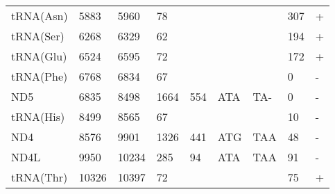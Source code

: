\documentclass[../DISSERTACAO_MAIN.tex]{subfiles}
\begin{document}
\begin{longtable}{llllllllllllllllllllll}
			tRNA(Asn)    & 5883           & \multicolumn{2}{l}{5960}  & \multicolumn{2}{l}{78}         & \multicolumn{3}{l}{}                          & \multicolumn{3}{l}{}              & \multicolumn{3}{l}{}      & \multicolumn{3}{l}{307}         & \multicolumn{4}{l}{+}                  \\
			tRNA(Ser)    & 6268           & \multicolumn{2}{l}{6329}  & \multicolumn{2}{l}{62}         & \multicolumn{3}{l}{}                          & \multicolumn{3}{l}{}              & \multicolumn{3}{l}{}      & \multicolumn{3}{l}{194}         & \multicolumn{4}{l}{+}                  \\
			tRNA(Glu)    & 6524           & \multicolumn{2}{l}{6595}  & \multicolumn{2}{l}{72}         & \multicolumn{3}{l}{}                          & \multicolumn{3}{l}{}              & \multicolumn{3}{l}{}      & \multicolumn{3}{l}{172}         & \multicolumn{4}{l}{+}                  \\
			tRNA(Phe)    & 6768           & \multicolumn{2}{l}{6834}  & \multicolumn{2}{l}{67}         & \multicolumn{3}{l}{}                          & \multicolumn{3}{l}{}              & \multicolumn{3}{l}{}      & \multicolumn{3}{l}{0}           & \multicolumn{4}{l}{-}                  \\
			ND5          & 6835           & \multicolumn{2}{l}{8498}  & \multicolumn{2}{l}{1664}       & \multicolumn{3}{l}{554}                       & \multicolumn{3}{l}{ATA}           & \multicolumn{3}{l}{TA-}   & \multicolumn{3}{l}{0}           & \multicolumn{4}{l}{-}                  \\
			tRNA(His)    & 8499           & \multicolumn{2}{l}{8565}  & \multicolumn{2}{l}{67}         & \multicolumn{3}{l}{}                          & \multicolumn{3}{l}{}              & \multicolumn{3}{l}{}      & \multicolumn{3}{l}{10}          & \multicolumn{4}{l}{-}                  \\
			ND4          & 8576           & \multicolumn{2}{l}{9901}  & \multicolumn{2}{l}{1326}       & \multicolumn{3}{l}{441}                       & \multicolumn{3}{l}{ATG}           & \multicolumn{3}{l}{TAA}   & \multicolumn{3}{l}{48}          & \multicolumn{4}{l}{-}                  \\
			ND4L         & 9950           & \multicolumn{2}{l}{10234} & \multicolumn{2}{l}{285}        & \multicolumn{3}{l}{94}                        & \multicolumn{3}{l}{ATA}           & \multicolumn{3}{l}{TAA}   & \multicolumn{3}{l}{91}          & \multicolumn{4}{l}{-}                  \\
			tRNA(Thr)    & 10326          & \multicolumn{2}{l}{10397} & \multicolumn{2}{l}{72}         & \multicolumn{3}{l}{}                          & \multicolumn{3}{l}{}              & \multicolumn{3}{l}{}      & \multicolumn{3}{l}{75}          & \multicolumn{4}{l}{+}                  \\

\end{longtable}
\end{document}
